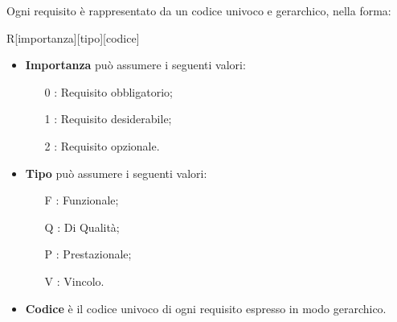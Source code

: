 \def\arraystretch{1.5}

Ogni requisito è rappresentato da un codice univoco e gerarchico, nella forma:
\begin{center}
        R[importanza][tipo][codice]
      \end{center}
      \begin{itemize}
        \item \textbf{Importanza} può assumere i seguenti valori:
          \bgroup
            \begin{itemize}
              \item [0]: Requisito obbligatorio;
              \item [1]: Requisito desiderabile;
              \item [2]: Requisito opzionale.
            \end{itemize}
          \egroup
        \item \textbf{Tipo} può assumere i seguenti valori:
          \bgroup
            \begin{itemize}
              \item [F]: Funzionale;
              \item [Q]: Di Qualità;
              \item [P]: Prestazionale;
              \item [V]: Vincolo.
            \end{itemize}
          \egroup
        \item \textbf{Codice} è il codice univoco di ogni requisito espresso in modo gerarchico.
      \end{itemize}

